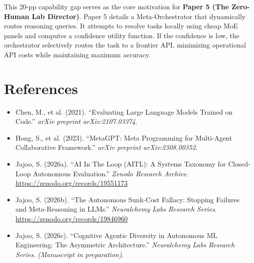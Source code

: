 \documentclass[11pt,a4paper]{article}
\begin{document}
This 20-pp capability gap serves as the core motivation for \textbf{Paper 5 (The Zero-Human Lab Director)}. Paper 5 details a Meta-Orchestrator that dynamically routes reasoning queries. It attempts to resolve tasks locally using cheap MoE panels and computes a confidence utility function. If the confidence is low, the orchestrator selectively routes the task to a frontier API, minimizing operational API costs while maintaining maximum accuracy.

\section{References}
\begin{itemize}
    \item Chen, M., et al. (2021). ``Evaluating Large Language Models Trained on Code.'' \textit{arXiv preprint arXiv:2107.03374}.
    \item Hong, S., et al. (2023). ``MetaGPT: Meta Programming for Multi-Agent Collaborative Framework.'' \textit{arXiv preprint arXiv:2308.00352}.
    \item Jajoo, S. (2026a). ``AI In The Loop (AITL): A Systems Taxonomy for Closed-Loop Autonomous Evaluation.'' \textit{Zenodo Research Archive}. \url{https://zenodo.org/records/19551173}
    \item Jajoo, S. (2026b). ``The Autonomous Sunk-Cost Fallacy: Stopping Failures and Meta-Reasoning in LLMs.'' \textit{Neuralchemy Labs Research Series}. \url{https://zenodo.org/records/19846960}
    \item Jajoo, S. (2026c). ``Cognitive Agentic Diversity in Autonomous ML Engineering: The Asymmetric Architecture.'' \textit{Neuralchemy Labs Research Series}. \textit{(Manuscript in preparation)}.
\end{itemize}
\end{document}
